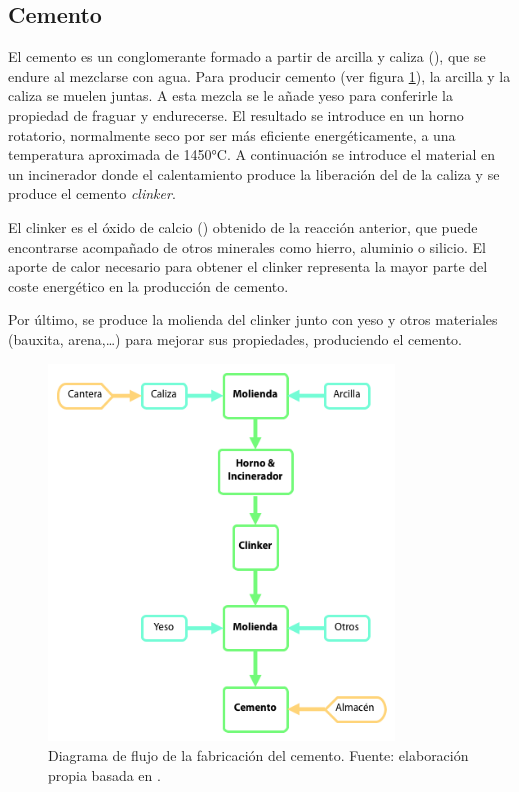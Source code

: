 \subsection{Cemento}
El cemento es un conglomerante formado a partir de arcilla y caliza (), que se endure al mezclarse con agua. Para producir cemento (ver figura \ref{fig:cemento}), la arcilla y la caliza se muelen juntas. A esta mezcla se le añade yeso para conferirle la propiedad de fraguar y endurecerse. El resultado se introduce en un horno rotatorio, normalmente seco por ser más eficiente energéticamente, a una temperatura aproximada de 1450\si{\celsius}. A continuación se introduce el material en un incinerador donde el calentamiento produce la liberación del  de la caliza y se produce el cemento \emph{clinker}.

\begin{center}
\end{center}

El clinker es el óxido de calcio () obtenido de la reacción anterior, que puede encontrarse acompañado de otros minerales como hierro, aluminio o silicio. El aporte de calor necesario para obtener el clinker representa la mayor parte del coste energético en la producción de cemento.

Por último, se produce la molienda del clinker junto con yeso y otros materiales (bauxita, arena,\ldots) para mejorar sus propiedades, produciendo el cemento.

\begin{figure}[!htb]
\centering
\includegraphics[height=10cm]{img/cemento.png}
\caption[Diagrama de flujo de la fabricación del cemento.]{Diagrama de flujo de la fabricación del cemento. Fuente: elaboración propia basada en \protect\cite{jsjunnesson}.}
\label{fig:cemento}
\end{figure}

